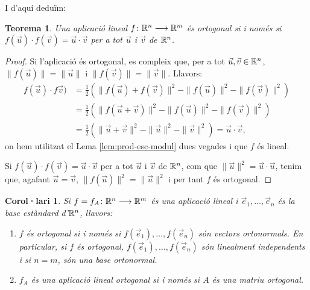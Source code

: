 \documentclass[
  11pt,
]{book}
\numberwithin{dummy}{section}
\theoremstyle{maincolornumbox}
\newtheorem{theorem}{TTTT}[chapter]
\newtheorem{theoremeT}{Teorema}[chapter]
\theoremstyle{blacknumex}
\theoremstyle{blacknumbox}
\newtheorem{corollaryT}{Corol·lari}[chapter]
\theoremstyle{maincolornum}
\renewenvironment{theorem}{\begin{tBox}\begin{theoremeT}}{\end{theoremeT}\end{tBox}}
\newenvironment{corollary}{\begin{cBox}\begin{corollaryT}}{\end{corollaryT}\end{cBox}}
\begin{document}
I d'aquí deduïm:

\begin{theorem}
Una aplicació lineal \(f\colon \mathbb{R}^n \longrightarrow \mathbb{R}^m\) és ortogonal si i només si
\(f(\vec u)\cdot f(\vec v)=\vec u \cdot \vec v\) per a tot \(\vec u\) i
\(\vec v\) de \(\mathbb{R}^n\).
\end{theorem}

\begin{proof}
Si l'aplicació és ortogonal, es compleix que, per a tot
\(\vec u,\vec v \in \mathbb{R}^n\), \(\|f(\vec u)\|=\|\vec u\|\) i
\(\|f(\vec v)\|=\|\vec v\|\). Llavors: \begin{align*}
    f(\vec u)\cdot f\vec v) & = \frac{1}{2}\left(\|f(\vec u) +f(\vec v)\|^2 - \|f(\vec u)\|^2 - \|f(\vec v)\|^2\right) \\
    & = \frac{1}{2}\left(\|f(\vec u+\vec v)\|^2 - \|f(\vec u)\|^2 - \|f(\vec v)\|^2\right) \\
     & = \frac{1}{2}\left(\|\vec u + \vec v\|^2 - \|\vec u\|^2 - \|\vec v\|^2\right) = \vec u \cdot \vec v  ,
\end{align*} on hem utilitzat el Lema
\ref{lem:prod-esc-modul} dues vegades i que \(f\) és lineal.

Si \(f(\vec u)\cdot f(\vec v)=\vec u \cdot \vec v\) per a tot \(\vec u\) i
\(\vec v\) de \(\mathbb{R}^n\), com que \(\|\vec u\|^2=\vec u \cdot \vec u\), tenim
que, agafant \(\vec u=\vec v\), \(\|f(\vec u)\|^2=\|\vec u\|^2\) i per tant
\(f\) és ortogonal.
\end{proof}

\begin{corollary}

Si \(f = f_A \colon \mathbb{R}^n \longrightarrow \mathbb{R}^m\) és una aplicació lineal i
\(\vec e_1, \dots, \vec e_n\) és la base estàndard d'\(\mathbb{R}^n\), llavors:

\begin{enumerate}
\def\labelenumi{\arabic{enumi}.}
\item
  \(f\) és ortogonal si i només si \(f(\vec e_1), \dots, f(\vec e_n)\) són
  vectors ortonormals. En particular, si \(f\) és ortogonal,
  \(f(\vec e_1), \dots, f(\vec e_n)\) són linealment independents i si
  \(n=m\), són una base ortonormal.
\item
  \(f_A\) és una aplicació lineal ortogonal si i només si \(A\) és una
  matriu ortogonal.
\end{enumerate}

\end{corollary}
\end{document}
